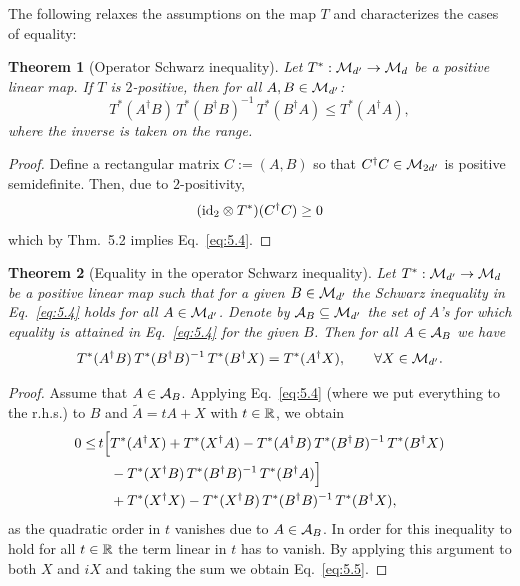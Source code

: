 \documentclass[11pt,a4paper]{article}
\theoremstyle{plain}
\newtheorem{theorem}{Theorem}[section]
\theoremstyle{definition}
\theoremstyle{remark}
\numberwithin{equation}{section}
\begin{document}
The following relaxes the assumptions on the map $T$ and characterizes the cases of
equality:

\begin{theorem}[Operator Schwarz inequality]
    Let $T^*:\mathcal{M}_{d'} \to \mathcal{M}_d$ be a positive linear map. If $T$ is $2$-positive, then
    for all $A,B \in \mathcal{M}_{d'}$:
    \begin{equation}\label{eq:5.4}
        T^*(A^\dagger B)\,T^*(B^\dagger B)^{-1}\,T^*(B^\dagger A) \le T^*(A^\dagger A),
    \end{equation}
    where the inverse is taken on the range.
\end{theorem}

\begin{proof}
    Define a rectangular matrix $C := (A,B)$ so that $C^\dagger C \in \mathcal{M}_{2d'}$ is
    positive semidefinite. Then, due to $2$-positivity,
    \[
        (\mathrm{id}_2\otimes T^*)(C^\dagger C) \ge 0
    \]
    which by Thm.~5.2 implies Eq.~\eqref{eq:5.4}.
\end{proof}

\begin{theorem}[Equality in the operator Schwarz inequality]
    Let $T^*:\mathcal{M}_{d'} \to \mathcal{M}_d$ be a positive linear map such that for a given
    $B\in \mathcal{M}_{d'}$ the Schwarz inequality in Eq.~\eqref{eq:5.4} holds for all
    $A\in \mathcal{M}_{d'}$. Denote by $\mathcal{A}_B\subseteq \mathcal{M}_{d'}$ the set of $A$'s for which
    equality is attained in Eq.~\eqref{eq:5.4} for the given $B$. Then for all
    $A\in \mathcal{A}_B$ we have
    \begin{equation}\label{eq:5.5}
        T^*(A^\dagger B)\,T^*(B^\dagger B)^{-1}\,T^*(B^\dagger X) = T^*(A^\dagger X),
        \qquad \forall X\in \mathcal{M}_{d'}.
    \end{equation}
\end{theorem}

\begin{proof}
    Assume that $A\in \mathcal{A}_B$. Applying Eq.~\eqref{eq:5.4} (where we put everything to
    the r.h.s.) to $B$ and $\widetilde A = tA+X$ with $t\in \mathbb{R}$, we obtain
    \begin{equation}\label{eq:5.6}
        \begin{aligned}
            0 \le & \, t\Big[
            T^*(A^\dagger X) + T^*(X^\dagger A)
            - T^*(A^\dagger B)\,T^*(B^\dagger B)^{-1}\,T^*(B^\dagger X) \\
                  & \hphantom{\, t\Big[}
                - T^*(X^\dagger B)\,T^*(B^\dagger B)^{-1}\,T^*(B^\dagger A)
            \Big]                                                       \\
                  & \quad + T^*(X^\dagger X)
            - T^*(X^\dagger B)\,T^*(B^\dagger B)^{-1}\,T^*(B^\dagger X),
        \end{aligned}
    \end{equation}
    as the quadratic order in $t$ vanishes due to $A\in \mathcal{A}_B$. In order for this
    inequality to hold for all $t\in \mathbb{R}$ the term linear in $t$ has to vanish. By applying
    this argument to both $X$ and $iX$ and taking the sum we obtain Eq.~\eqref{eq:5.5}.
\end{proof}
\end{document}
